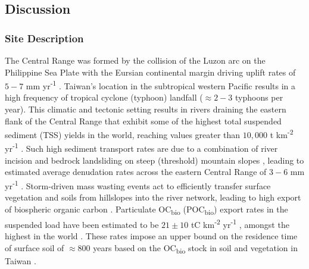 \subsection{Discussion}

\subsubsection{Site Description}\label{Ch6SD1}

The Central Range was formed by the collision of the Luzon arc on the Philippine Sea Plate with the Eursian continental margin driving uplift rates of $5 - 7$ mm yr\textsuperscript{-1} \citep{Teng:1990tu,Dadson:2003kl}. Taiwan's location in the subtropical western Pacific results in a high frequency of tropical cyclone (typhoon) landfall ($\approx 2 - 3$ typhoons per year). This climatic and tectonic setting results in rivers draining the eastern flank of the Central Range that exhibit some of the highest total suspended sediment (TSS) yields in the world, reaching values greater than $10,000$ t km\textsuperscript{-2} yr\textsuperscript{-1} \citep{Dadson:2003kl}. Such high sediment transport rates are due to a combination of river incision and bedrock landsliding on steep (threshold) mountain slopes \citep{Hovius:2000ht}, leading to estimated average denudation rates across the eastern Central Range of $3 - 6$ mm yr\textsuperscript{-1} \citep{Dadson:2003kl}. Storm-driven mass wasting events act to efficiently transfer surface vegetation and soils from hillslopes into the river network, leading to high export of biospheric organic carbon \citep[OC\textsubscript{bio};][]{Hilton:2008fo}. Particulate OC\textsubscript{bio} (POC\textsubscript{bio}) export rates in the suspended load have been estimated to be $21 \pm 10$ tC km\textsuperscript{-2} yr\textsuperscript{-1} \citep{Hilton:2012dt}, amongst the highest in the world \citep{Galy:2015fx}. These rates impose an upper bound on the residence time of surface soil of $\approx 800$ years based on the OC\textsubscript{bio} stock in soil and vegetation in Taiwan \citep{Hilton:2012dt}.

